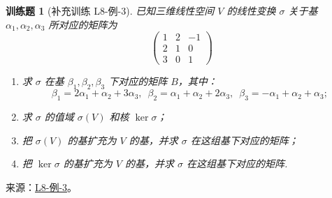 \documentclass[12pt,fontset=fandol]{ctexart}
\newtheorem{exercise}{训练题}[section]
\begin{document}
\begin{exercise}[补充训练 L8-例-3]\label{prob:L8-例-3}
已知三维线性空间 $V$ 的线性变换 $\sigma$ 关于基 $\alpha_1,\alpha_2,\alpha_3$ 所对应的矩阵为
    \[\begin{pmatrix}1 & 2 & -1 \\ 2 & 1 & 0 \\ 3 & 0 & 1\end{pmatrix}\]
    \begin{enumerate}
        \item 求 $\sigma$ 在基 $\beta_1,\beta_2,\beta_3$ 下对应的矩阵 $B$，其中：
              \[\beta_1=2\alpha_1+\alpha_2+3\alpha_3,\enspace \beta_2=\alpha_1+\alpha_2+2\alpha_3,\enspace \beta_3=-\alpha_1+\alpha_2+\alpha_3;\]

        \item 求 $\sigma$ 的值域 $\sigma(V)$ 和核 $\ker\sigma$；

        \item 把 $\sigma(V)$ 的基扩充为 $V$ 的基，并求 $\sigma$ 在这组基下对应的矩阵；

        \item 把 $\ker\sigma$ 的基扩充为 $V$ 的基，并求 $\sigma$ 在这组基下对应的矩阵.
    \end{enumerate}
\end{exercise}
\noindent 来源：\href{https://github.com/yhwu-is/Linear-Algebra-Left-Undone/blob/new/%E8%AE%B2%E4%B9%89/%E4%B8%93%E9%A2%98/8%20%E7%9B%B8%E6%8A%B5%E6%A0%87%E5%87%86%E5%BD%A2.tex}{L8-例-3}。
\end{document}
